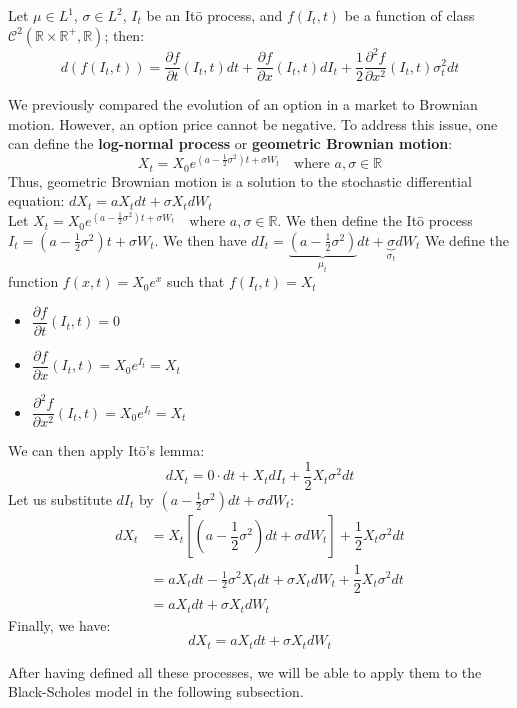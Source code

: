 \begin{definitionbox}[frametitle = {Itō's Lemma}]
Let $\mu\in L^1$, $\sigma\in L^2$, $I_t$ be an Itō process, and $f(I_t,t)$ be a function of class $\mathcal{C}^2(\mathbb{R \times R^+, R})$; then:
$$d(f(I_t,t))=\dfrac{\partial f}{\partial t}(I_t,t)dt+\dfrac{\partial f}{\partial x}(I_t,t)dI_t+\frac{1}{2}\dfrac{\partial^2 f}{\partial x^2}(I_t,t)\sigma^2_tdt$$
\end{definitionbox}

\newpage

We previously compared the evolution of an option in a market to Brownian motion. However, an option price cannot be negative. 
To address this issue, one can define the \textbf{log-normal process} or \textbf{geometric Brownian motion}:
$$X_t = X_0e^{(a-\frac{1}{2}\sigma^2)t + \sigma W_t} \quad\text{where } a,\sigma\in \mathbb{R}$$
Thus, geometric Brownian motion is a solution to the stochastic differential equation: $dX_t = a X_t dt + \sigma X_t dW_t$ \\
\proofname{}
Let $X_t = X_0e^{(a-\frac{1}{2}\sigma^2)t + \sigma W_t} \quad\text{where } a,\sigma\in \mathbb{R}$. We then define the Itō process $I_t = (a - \frac{1}{2}\sigma^2)t + \sigma W_t$.
We then have $dI_t = \underbrace{(a - \frac{1}{2}\sigma^2)}_{\mu_t} dt + \underbrace{\sigma}_{\sigma_t} dW_t$
We define the function $f(x, t) = X_0 e^x$ such that $f(I_t, t) = X_t$
\begin{itemize} 
\item $\dfrac{\partial f}{\partial t}(I_t, t)=0$ 
\item $\dfrac{\partial f}{\partial x}(I_t, t)=X_0e^{I_t}=X_t$ 
\item $\dfrac{\partial^2 f}{\partial x^2}(I_t, t)=X_0e^{I_t}=X_t$
\end{itemize}
We can then apply Itō's lemma:
$$dX_t = 0 \cdot dt + X_tdI_t+\dfrac{1}{2}X_t\sigma^2dt$$
Let us substitute $dI_t$ by $(a - \frac{1}{2}\sigma^2)dt + \sigma dW_t$:
\begin{align*} 
    dX_t &= X_t[(a-\dfrac{1}{2}\sigma^2)dt+\sigma dW_t] + \dfrac{1}{2}X_t\sigma^2dt\\
    &= aX_tdt - \frac{1}{2}\sigma^2X_tdt +\sigma X_tdW_t+\dfrac{1}{2}X_t\sigma^2dt \\ 
    &=aX_tdt+\sigma X_tdW_t
\end{align*}
Finally, we have:
$$dX_t = a X_t dt + \sigma X_t dW_t$$

After having defined all these processes, we will be able to apply them to the Black-Scholes model in the following subsection.

